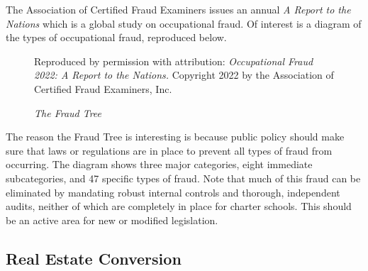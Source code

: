 The Association of Certified Fraud Examiners issues an annual \textit{A Report to the Nations} which is a global study on occupational fraud. Of interest is a diagram of the types of occupational fraud, reproduced below.
\begin{figure}[htbp]
  \caption{\textit{The Fraud Tree}}%
  \label{fig:fraud-tree}\centering%
    {Reproduced by permission with attribution: \textit{Occupational Fraud 2022: A Report to the Nations.} Copyright 2022 by the Association of Certified Fraud Examiners, Inc.}
  \end{figure}
  The reason the Fraud Tree is interesting is because public policy should make sure that laws or regulations are in place to prevent all types of fraud from occurring. The diagram shows three major categories, eight immediate subcategories, and 47 specific types of fraud. Note that much of this fraud can be eliminated by mandating robust internal controls and thorough, independent audits, neither of which are completely in place for charter schools. This should be an active area for new or modified legislation.

\subsection{Real Estate Conversion}%
\label{sec:real-estate-conv}\indent%

